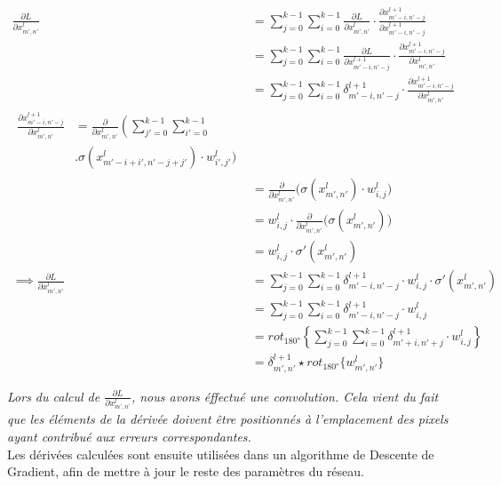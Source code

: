 \begin{multicols}{2}
{\scriptsize
\begin{align}
\frac{\partial L}{\partial x^{l}_{m',n'}} &= \sum_{j=0}^{k-1}\sum_{i=0}^{k-1}\frac{\partial L}{\partial x_{m',n'}^{l}}\cdot\frac{\partial x_{m'-i,n'-j}^{l+1}}{\partial x_{m'-i,n'-j}^{l+1}}\\
&= \sum_{j=0}^{k-1}\sum_{i=0}^{k-1}\frac{\partial L}{\partial x_{m'-i,n'-j}^{l+1}}\cdot\frac{\partial x_{m'-i,n'-j}^{l+1}}{\partial x_{m',n'}^{l}}\\
&=   \sum_{j=0}^{k-1}\sum_{i=0}^{k-1}\delta^{l+1}_{m'-i,n'-j}\cdot\frac{\partial x_{m'-i,n'-j}^{l+1}}{\partial x_{m',n'}^{l}}\\
\begin{split}
    \frac{\partial x_{m'-i,n'-j}^{l+1}}{\partial x_{m',n'}^{l}} &= \frac{\partial}{\partial x^{l}_{m',n'}}\left( \sum_{j'=0}^{k-1}\sum_{i'=0}^{k-1}\right.  \\ 
    &  \biggl.\sigma(x^{l}_{m'-i+i',n'-j+j'})  \cdot w^{l}_{i',j'}  \bigg)
\end{split} \\
&= \frac{\partial}{\partial x^{l}_{m',n'}}\big(\sigma(x^{l}_{m',n'})\cdot w^{l}_{i,j}\big)\\
&= w^{l}_{i,j}\cdot \frac{\partial}{\partial x^{l}_{m',n'}}\big(\sigma(x^{l}_{m',n'})\big)\\
&= w^{l}_{i,j}\cdot \sigma'(x^{l}_{m',n'})\\
\implies \frac{\partial L}{\partial x^{l}_{m',n'}} &=  \sum_{j=0}^{k-1}\sum_{i=0}^{k-1}\delta^{l+1}_{m'-i,n'-j}\cdot w^{l}_{i,j}\cdot \sigma'(x^{l}_{m',n'})\\
&= \sum_{j=0}^{k-1}\sum_{i=0}^{k-1}\delta^{l+1}_{m'-i,n'-j}\cdot w^{l}_{i,j}\\
&= rot_{\ang{180}}\left \{ \sum_{j=0}^{k-1}\sum_{i=0}^{k-1}\delta^{l+1}_{m'+i,n'+j}\cdot w^{l}_{i,j} \right \} \\
& = \delta^{l+1}_{m',n'} \star rot_{\ang{180}}\{w^{l}_{m',n'}\}
\end{align}}

\textit{Lors du calcul de $\frac{\partial L}{\partial x^{l}_{m’,n’}}$, nous avons éffectué une convolution. 
Cela vient du fait que les éléments de la dérivée doivent être positionnés à l'emplacement des pixels 
ayant contribué aux erreurs correspondantes.}\\

Les dérivées calculées sont ensuite utilisées dans un algorithme de Descente de Gradient\cite{GradientDescent},
afin de mettre à jour le reste des paramètres du réseau.


\end{multicols}
